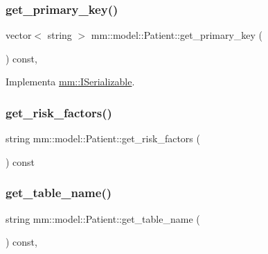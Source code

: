 \subsubsection{\texorpdfstring{get\+\_\+primary\+\_\+key()}{get\_primary\_key()}}
{\footnotesize\ttfamily vector$<$ string $>$ mm\+::model\+::\+Patient\+::get\+\_\+primary\+\_\+key (\begin{DoxyParamCaption}{ }\end{DoxyParamCaption}) const\hspace{0.3cm}{\ttfamily [override]}, {\ttfamily [virtual]}}



Implementa \hyperlink{classmm_1_1_i_serializable_a69c0c514e11e386b6cb1fbd03f14da17}{mm\+::\+I\+Serializable}.

\mbox{\label{classmm_1_1model_1_1_patient_a7ab70bc4aafc95f687c29d02ac398e06}} 
\subsubsection{\texorpdfstring{get\+\_\+risk\+\_\+factors()}{get\_risk\_factors()}}
{\footnotesize\ttfamily string mm\+::model\+::\+Patient\+::get\+\_\+risk\+\_\+factors (\begin{DoxyParamCaption}{ }\end{DoxyParamCaption}) const}

\mbox{\label{classmm_1_1model_1_1_patient_abe79da3e4fabd80e039ae4880dfa76cb}} 
\subsubsection{\texorpdfstring{get\+\_\+table\+\_\+name()}{get\_table\_name()}}
{\footnotesize\ttfamily string mm\+::model\+::\+Patient\+::get\+\_\+table\+\_\+name (\begin{DoxyParamCaption}{ }\end{DoxyParamCaption}) const\hspace{0.3cm}{\ttfamily [override]}, {\ttfamily [virtual]}}



